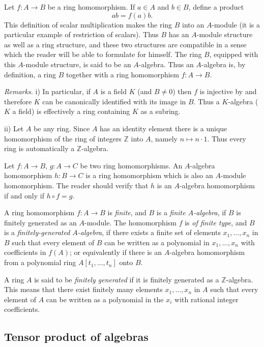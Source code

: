 Let $f:A\longrightarrow B$ be a ring homomorphism. If $a\in A$ and $b\in B$, define a product
\[
 ab=f(a)b.
\]
This definition of scalar multiplication makes the ring $B$ into an $A$-module (it is a particular example of restriction of scalars). Thus $B$ has an $A$-module structure as well as a ring structure, and these two structures are compatible in a sense which the reader will be able to formulate for himself. The ring $B$, equipped with this $A$-module structure, is said to be an $A$-algebra. Thus an $A$-algebra is, by definition, a ring $B$ together with a ring homomorphism $f:A\longrightarrow B$.

\noindent\textit{Remarks.} i) In particular, if $A$ is a field $K$ (and $B\neq0$) then $f$ is injective by  and therefore $K$ can be canonically identified with its image in $B$. Thus a $K$-algebra ($K$ a field) is effectively a ring containing $K$ as a subring.

ii) Let $A$ be any ring. Since $A$ has an identity element there is a unique homomorphism of the ring of integers $\mathbb Z$ into $A$, namely $n\mapsto n\cdot1$. Thus every ring is automatically a $\mathbb Z$-algebra.

Let $f:A\longrightarrow B$, $g:A\longrightarrow C$ be two ring homomorphisms. An $A$-algebra homomorphism $h:B\longrightarrow C$ is a ring homomorphism which is also an $A$-module homomorphism. The reader should verify that $h$ is an $A$-algebra homomorphism if and only if $h\circ f=g$.

A ring homomorphism $f:A\longrightarrow B$ is \textit{finite}, and $B$ is a \textit{finite $A$-algebra}, if $B$ is finitely generated as an $A$-module. The homomorphism $f$ is \textit{of finite type}, and $B$ is a \textit{finitely-generated $A$-algebra}, if there exists a finite set of elements $x_1,\ldots,x_n$ in $B$ such that every element of $B$ can be written as a polynomial in $x_1,\ldots,x_n$ with coefficients in $f(A)$; or equivalently if there is an $A$-algebra homomorphism from a polynomial ring $A[t_1,\ldots,t_n]$ onto $B$.

A ring $A$ is said to be \textit{finitely generated} if it is finitely generated as a $\mathbb Z$-algebra. This means that there exist finitely many elements $x_1,\ldots,x_n$ in $A$ such that every element of $A$ can be written as a polynomial in the $x_i$ with rational integer coefficients.

\subsection{Tensor product of algebras}


